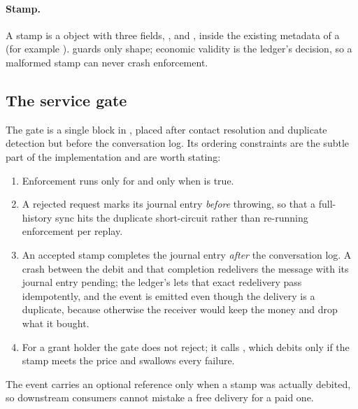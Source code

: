 \paragraph{Stamp.}
A stamp is a  object with three fields, ,  and
, inside the existing  metadata of a 
(for example ).
 guards only shape; economic validity is the ledger's decision,
so a malformed stamp can never crash enforcement.

\subsection{The service gate}

The gate is a single block in , placed
after contact resolution and duplicate detection but before the conversation log. Its
ordering constraints are the subtle part of the implementation and are worth stating:

\begin{enumerate}
  \item Enforcement runs only for  and only when
         is true.
  \item A rejected request marks its journal entry  \emph{before} throwing,
        so that a full-history sync hits the duplicate short-circuit rather than re-running
        enforcement per replay.
  \item An accepted stamp completes the journal entry \emph{after} the conversation log.
        A crash between the debit and that completion redelivers the message with its
        journal entry pending; the ledger's  lets that exact redelivery
        pass idempotently, and the event is emitted even though the delivery is a duplicate,
        because otherwise the receiver would keep the money and drop what it bought.
  \item For a grant holder the gate does not reject; it calls
        , which debits only if the stamp meets the
         price and swallows every failure.
\end{enumerate}

The  event carries an optional 
reference only when a stamp was actually debited, so downstream consumers cannot
mistake a free delivery for a paid one.


